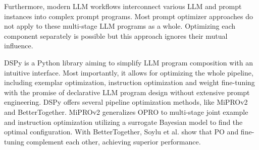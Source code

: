 Furthermore, modern LLM workflows interconnect various LLM and prompt instances into complex prompt programs.
Most prompt optimizer approaches do not apply to these multi-stage LLM programs\cite{opsahlong2024optimizinginstructionsdemonstrationsmultistage}
as a whole. Optimizing each component separately is possible but this approach ignores their mutual influence.

DSPy\cite{khattab2023dspycompilingdeclarativelanguage} is a Python library aiming to simplify LLM program composition with 
an intuitive interface. Most importantly, it allows for optimizing the whole pipeline, including exemplar optimization, instruction optimization and weight fine-tuning
with the promise of declarative LLM program design without extensive prompt engineering. DSPy offers several pipeline optimization
methods, like MiPROv2\cite{opsahlong2024optimizinginstructionsdemonstrationsmultistage} and BetterTogether\cite{soylu2024finetuningpromptoptimizationgreat}.
MiPROv2 generalizes OPRO\cite{yang2024largelanguagemodelsoptimizers} to multi-stage joint example and instruction optimization
utilizing a surrogate Bayesian model to find the optimal configuration. With BetterTogether, Soylu et al. show that PO and fine-tuning
complement each other, achieving superior performance.

